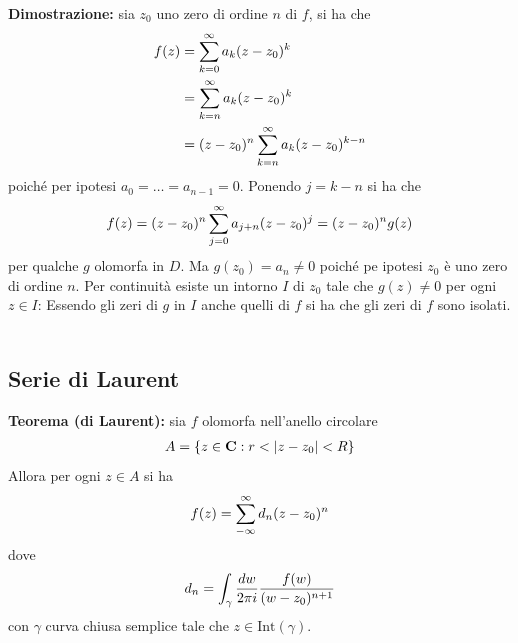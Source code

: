\documentclass{article}
\begin{document}
\textbf{Dimostrazione:} sia $z_0$ uno zero di ordine $n$ di $f$, si ha che
\begin{align}
    f(z) &= \sum_{k = 0}^\infty a_k(z - z_0)^k \notag \\
    &= \sum_{k = n}^\infty a_k(z - z_0)^k \notag \\
    &= (z - z_0)^n\sum_{k = n}^\infty a_k(z - z_0)^{k - n} \notag
\end{align}
poiché per ipotesi $a_0 = \dots = a_{n - 1} = 0$. Ponendo $j = k - n$ si ha che
\begin{gather}
    f(z) = (z - z_0)^n\sum_{j = 0}^\infty a_{j + n}(z - z_0)^j = (z - z_0)^ng(z) \notag
\end{gather}
per qualche $g$ olomorfa in $D$. Ma $g(z_0) = a_n \neq 0$ poiché pe ipotesi $z_0$ è uno zero di ordine $n$. Per continuità esiste un intorno $I$ di $z_0$ tale che $g(z) \neq 0$ per ogni $z \in I$: Essendo gli zeri di $g$ in $I$ anche quelli di $f$ si ha che gli zeri di $f$ sono isolati. \\ \\

\newpage
\subsection{Serie di Laurent}
\textbf{Teorema (di Laurent):} sia $f$ olomorfa nell'anello circolare
\begin{gather}
    A = \{z \in \mathbf{C} : r < |z - z_0| < R\} \notag
\end{gather}
Allora per ogni $z \in A$ si ha
\begin{gather}
    f(z) = \sum_{-\infty}^\infty d_n(z - z_0)^n \notag
\end{gather}
dove
\begin{gather}
    d_n = \int_\gamma\frac{dw}{2\pi i}\frac{f(w)}{(w - z_0)^{n + 1}} \notag
\end{gather}
con $\gamma$ curva chiusa semplice tale che $z \in \mathrm{Int}(\gamma)$. \\
\end{document}
